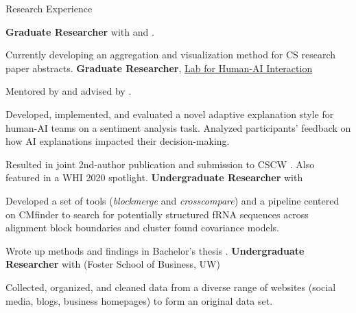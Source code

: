 \begin{rubric}{Research Experience}

	\textbf{Graduate Researcher} with \pGlassmanE{} and \pWeldD{}.
	\par Currently developing an aggregation and visualization method for CS research paper abstracts.
	\textbf{Graduate Researcher}, \href{http://hai.cs.washington.edu}{Lab for Human-AI Interaction}
	\par Mentored by \pBansalG{} and advised by \pWeldD{}.
	\par Developed, implemented, and evaluated a novel adaptive explanation style for human-AI teams on a sentiment analysis task. Analyzed participants' feedback on how AI explanations impacted their decision-making.
	\par Resulted in joint 2nd-author publication and submission to CSCW \cite{bansal2020does}. Also featured in a WHI 2020 spotlight.
\entry*[2018 -- 2019] %
    \textbf{Undergraduate Researcher} with \pRuzzoL{}
    \par Developed a set of tools (\textit{blockmerge} and \textit{crosscompare}) and a pipeline centered on CMfinder to search for potentially structured fRNA sequences across alignment block boundaries and cluster found covariance models.
    \par Wrote up methods and findings in Bachelor's thesis \cite{zhou2019thesis}.
\entry*[2018 -- 2019] %
	\textbf{Undergraduate Researcher} with \pPahnkeE{} (Foster School of Business, UW)
	\par Collected, organized, and cleaned data from a diverse range of websites (social media, blogs, business homepages) to form an original data set.
\end{rubric}
